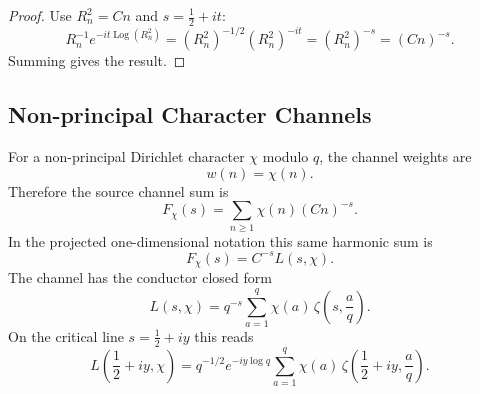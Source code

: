\documentclass[11pt]{article}
\DeclareMathOperator{\Log}{Log}
\begin{document}
\begin{proof}
Use $R_n^2=Cn$ and $s=\frac12+it$:
\[
  R_n^{-1}e^{-it\Log(R_n^2)}
  =
  (R_n^2)^{-1/2}(R_n^2)^{-it}
  =
  (R_n^2)^{-s}
  =
  (Cn)^{-s}.
\]
Summing gives the result.
\end{proof}

\subsection{Non-principal Character Channels}

For a non-principal Dirichlet character $\chi$ modulo $q$, the channel weights are
\[
  w(n)=\chi(n).
\]
Therefore the source channel sum is
\[
  F_\chi(s)
  =
  \sum_{n\ge1}\chi(n)(Cn)^{-s}.
\]
In the projected one-dimensional notation this same harmonic sum is
\[
  F_\chi(s)=C^{-s}L(s,\chi).
\]
The channel has the conductor closed form
\[
  L(s,\chi)=q^{-s}\sum_{a=1}^{q}\chi(a)\,
  \zeta\!\left(s,\frac aq\right).
\]
On the critical line $s=\frac12+iy$ this reads
\[
  L\!\left(\frac12+iy,\chi\right)
  =
  q^{-1/2}e^{-iy\log q}
  \sum_{a=1}^{q}\chi(a)\,
  \zeta\!\left(\frac12+iy,\frac aq\right).
\]
\end{document}
